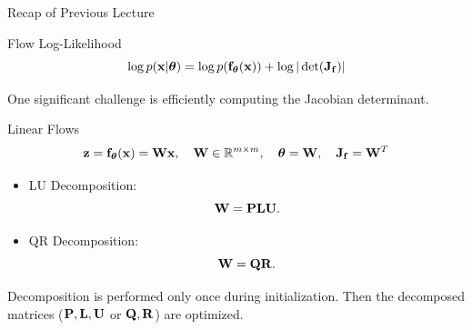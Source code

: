 \documentclass{beamer}
\begin{document}
\begin{frame}{Recap of Previous Lecture}
	\vspace{-0.5cm}
	\begin{block}{Flow Log-Likelihood}
		\vspace{-0.3cm}
		\[
			\log p(\mathbf{x}|\boldsymbol{\theta}) = \log p(\mathbf{f}_{\boldsymbol{\theta}}(\mathbf{x})) + \log |\det (\mathbf{J}_{\mathbf{f}})|
		\]
		\vspace{-0.5cm}
	\end{block}
	One significant challenge is efficiently computing the Jacobian determinant.
	\begin{block}{Linear Flows}	
		\vspace{-0.2cm}
		\[
			\mathbf{z} = \mathbf{f}_{\boldsymbol{\theta}}(\mathbf{x}) = \mathbf{W} \mathbf{x}, \quad \mathbf{W} \in \mathbb{R}^{m \times m}, \quad \boldsymbol{\theta} = \mathbf{W}, \quad \mathbf{J}_{\mathbf{f}} = \mathbf{W}^T
		\]
	\end{block}
	\vspace{-0.3cm}
	\begin{itemize}
		\item LU Decomposition:
		\[
			\mathbf{W} = \mathbf{P} \mathbf{L} \mathbf{U}.
		\]
		\item QR Decomposition:
		\[
			\mathbf{W} = \mathbf{Q} \mathbf{R}.
		\]
	\end{itemize}
	Decomposition is performed only once during initialization. Then the decomposed matrices ($\mathbf{P}, \mathbf{L}, \mathbf{U}$ or $\mathbf{Q}, \mathbf{R}$) are optimized.
\end{frame}
\end{document}
